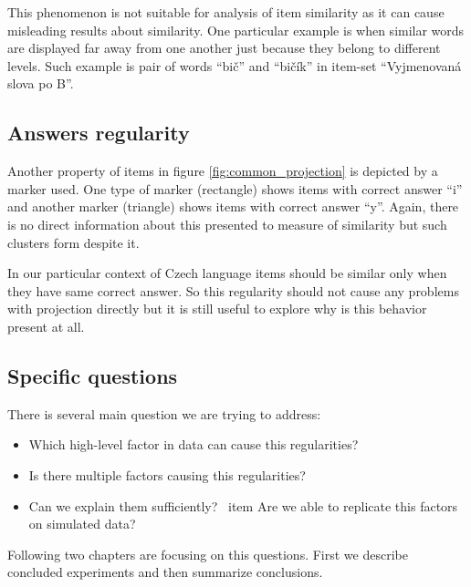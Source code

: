 \documentclass[
  digital, %
  table,   %
  nolof,     %
  nolot,     %
  nocover,
  color
]{fithesis3}
\begin{document}

This phenomenon is not suitable for analysis of item similarity as it can cause misleading results about similarity. One particular example is when similar words are displayed far away from one another just because they belong to different levels. Such example is pair of words ``bič'' and ``bičík'' in item-set ``Vyjmenovaná slova po B''.


\subsection{Answers regularity}\label{answers-regularity}

Another property of items in figure \ref{fig:common_projection} is depicted by a marker used. One type of marker (rectangle) shows items with correct answer ``i'' and another marker (triangle) shows items with correct answer ``y''. Again, there is no direct information about this presented to measure of similarity but such clusters form despite it.

In our particular context of Czech language items should be similar only when they have same correct answer. So this regularity should not cause any problems with projection directly but it is still useful to explore why is this behavior present at all.


\subsection{Specific questions}\label{specific-questions}

There is several main question we are trying to address:

\begin{itemize}
 \item Which high-level factor in data can cause this regularities?
 \item Is there multiple factors causing this regularities?
 \item Can we explain them sufficiently?
 \ item Are we able to replicate this factors on simulated data?
\end{itemize}


Following two chapters are focusing on this questions. First we describe concluded experiments and then summarize conclusions.
\end{document}
